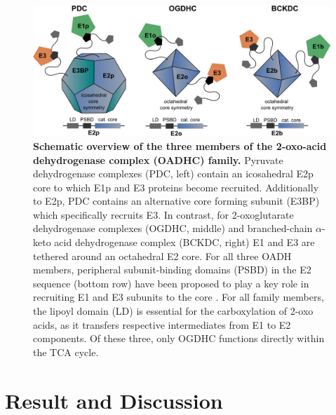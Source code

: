 \begin{figure}[hbt!]
\centering
\includegraphics[width=\textwidth]{Chapter.5/Figures/Figure1.png}
\caption{\textbf{Schematic overview of the three members of the 2-oxo-acid dehydrogenase complex (OADHC) family.} Pyruvate dehydrogenase complexes (PDC, left) contain an icosahedral E2p core to which E1p and E3 proteins become recruited. Additionally to E2p, PDC contains an alternative core forming subunit (E3BP) which specifically recruits E3. In contrast, for 2-oxoglutarate dehydrogenase complexes (OGDHC, middle) and branched-chain $\alpha$-keto acid dehydrogenase complex (BCKDC, right) E1 and E3 are tethered around an octahedral E2 core. For all three OADH members, peripheral subunit-binding domains (PSBD) in the E2 sequence (bottom row) have been proposed to play a key role in recruiting E1 and E3 subunits to the core \cite{Perham_2000}. For all family members, the lipoyl domain (LD) is essential for the carboxylation of 2-oxo acids, as it transfers respective intermediates from E1 to E2 components. Of these three, only OGDHC functions directly within the TCA cycle.}
\label{fig:ch5_fig1}
\end{figure}

\section{Result and Discussion}
